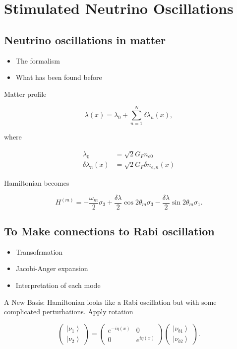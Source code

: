 \documentclass[%
preprint,
 amsmath,amssymb,
 aps,
]{revtex4-1}
\newcommand{\ket}[1]{\left| #1\right\rangle}
\begin{document}
\section{\label{stimulated}Stimulated Neutrino Oscillations}



\subsection{Neutrino oscillations in matter}

\begin{itemize}
    \item The formalism
    \item What has been found before
\end{itemize}


    Matter profile

\begin{equation}
    \lambda(x) = \lambda_0 + \sum_{n=1}^{N} \delta \lambda_n (x),
\end{equation}

where

\begin{align}
    \lambda_0 &= \sqrt{2}G_F n_{e0} \\
    \delta \lambda_n(x) &= \sqrt{2}G_F \delta n_{e,n}(x)
\end{align}


Hamiltonian becomes

\begin{equation}
    H^{(m)} = - \frac{\omega_m}{2} \sigma_3 + \frac{\delta \lambda}{2} \cos 2\theta_m \sigma_3 - \frac{\delta \lambda}{2} \sin 2 \theta_m \sigma_1.
\end{equation}


\subsection{To Make connections to Rabi oscillation}

\begin{itemize}
    \item Transofrmation
    \item Jacobi-Anger expansion
    \item Interpretation of each mode
\end{itemize}


A New Basis: Hamiltonian looks like a Rabi oscillation but with some complicated perturbations.
    Apply rotation


\begin{equation}
\begin{pmatrix} \ket{\nu_1} \\ \ket{\nu_2} \end{pmatrix} = \begin{pmatrix} e^{-i \eta (x)} & 0 \\  0 & e^{i \eta (x)}  \end{pmatrix} \begin{pmatrix} \ket{\nu_{b1}} \\ \ket{\nu_{b2}} \end{pmatrix}.
\end{equation}
\end{document}
